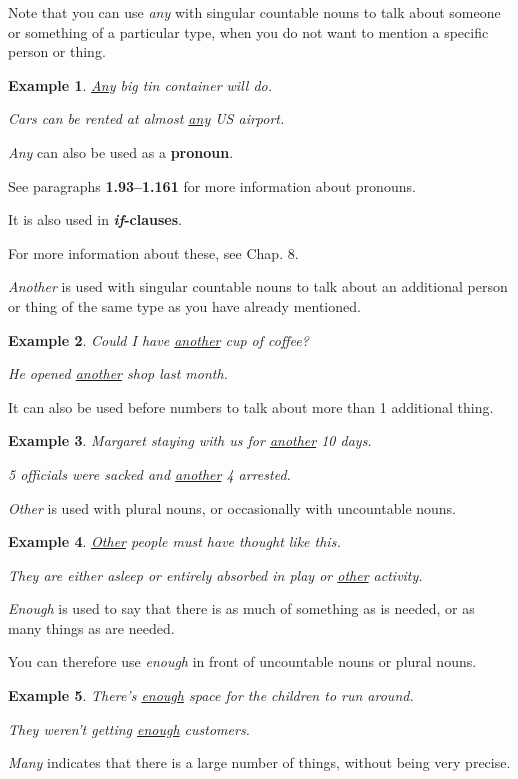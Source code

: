 \documentclass[oneside]{book}
\numberwithin{equation}{section}
\newtheorem{example}{Example}[section]
\begin{document}
%
Note that you can use \textit{any} with singular countable nouns to talk about someone or something of a particular type, when you do not want to mention a specific person or thing.
\begin{example}
    \underline{Any} big tin container will do.
    
    Cars can be rented at almost \underline{any} US airport.
\end{example}
\textit{Any} can also be used as a \textbf{pronoun}.

See paragraphs \textbf{1.93--1.161} for more information about pronouns.

It is also used in \textbf{\textit{if}-clauses}.

For more information about these, see Chap. 8.

%
\noindent{} \textit{Another} is used with singular countable nouns to talk about an additional person or thing of the same type as you have already mentioned.
\begin{example}
    Could I have \underline{another} cup of coffee?
    
    He opened \underline{another} shop last month.
\end{example}
It can also be used before numbers to talk about more than 1 additional thing.
\begin{example}
    Margaret staying with us for \underline{another} 10 days.
    
    5 officials were sacked and \underline{another} 4 arrested.
\end{example}
\textit{Other} is used with plural nouns, or occasionally with uncountable nouns.
\begin{example}
    \underline{Other} people must have thought like this.
    
    They are either asleep or entirely absorbed in play or \underline{other} activity.
\end{example}
%
\noindent{} \textit{Enough} is used to say that there is as much of something as is needed, or as many things as are needed.

You can therefore use \textit{enough} in front of uncountable nouns or plural nouns.
\begin{example}
    There's \underline{enough} space for the children to run around.
    
    They weren't getting \underline{enough} customers.
\end{example}
\textit{Many} indicates that there is a large number of things, without being very precise.
\end{document}
